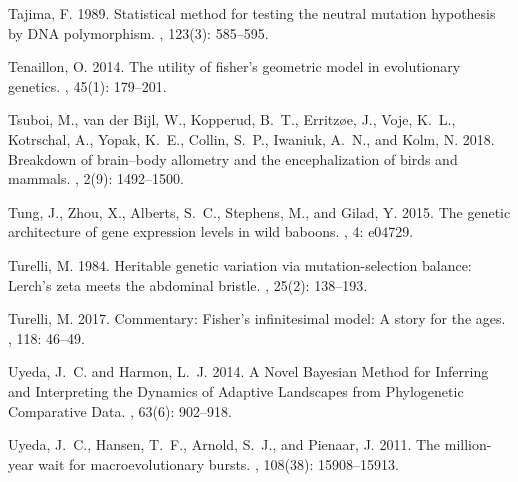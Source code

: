 \documentclass{article}
\begin{document}
\begin{thebibliography}{}
    Tajima, F. 1989.
    \newblock Statistical method for testing the neutral mutation hypothesis by
        {{DNA}} polymorphism.
    , {123}(3): 585--595.

    Tenaillon, O. 2014.
    \newblock The utility of fisher's geometric model in evolutionary genetics.
    ,
        {45}(1): 179--201.

    Tsuboi, M., {van der Bijl}, W., Kopperud, B.~T., Erritz{\o}e, J., Voje, K.~L.,
    Kotrschal, A., Yopak, K.~E., Collin, S.~P., Iwaniuk, A.~N., and Kolm, N.
    2018.
    \newblock Breakdown of brain--body allometry and the encephalization of birds
    and mammals.
    , {2}(9): 1492--1500.

    Tung, J., Zhou, X., Alberts, S.~C., Stephens, M., and Gilad, Y. 2015.
    \newblock The genetic architecture of gene expression levels in wild baboons.
    , {4}: e04729.

    Turelli, M. 1984.
    \newblock Heritable genetic variation via mutation-selection balance:
        {{Lerch}}'s zeta meets the abdominal bristle.
    , {25}(2): 138--193.

    Turelli, M. 2017.
    \newblock Commentary: {{Fisher}}'s infinitesimal model: {{A}} story for the
    ages.
    , {118}: 46--49.

    Uyeda, J.~C. and Harmon, L.~J. 2014.
    \newblock A {{Novel Bayesian Method}} for {{Inferring}} and {{Interpreting}}
    the {{Dynamics}} of {{Adaptive Landscapes}} from {{Phylogenetic Comparative
    Data}}.
    , {63}(6): 902--918.

    Uyeda, J.~C., Hansen, T.~F., Arnold, S.~J., and Pienaar, J. 2011.
    \newblock The million-year wait for macroevolutionary bursts.
    , {108}(38):
    15908--15913.


\end{thebibliography}
\end{document}
